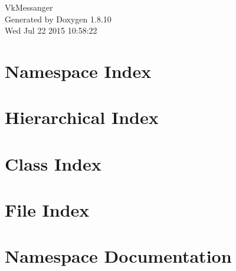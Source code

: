 \documentclass[twoside]{book}
\newcommand{\+}{\discretionary{\mbox{\scriptsize$\hookleftarrow$}}{}{}}
\newcommand{\clearemptydoublepage}{%
  \newpage{\pagestyle{empty}\cleardoublepage}%
}
\begin{document}
\hypersetup{pageanchor=false,
             bookmarks=true,
             bookmarksnumbered=true,
             pdfencoding=unicode
            }
\begin{titlepage}
\vspace*{7cm}
\begin{center}%
{\Large Vk\+Messanger }\\
\vspace*{1cm}
{\large Generated by Doxygen 1.8.10}\\
\vspace*{0.5cm}
{\small Wed Jul 22 2015 10:58:22}\\
\end{center}
\end{titlepage}
\clearemptydoublepage
\tableofcontents
\clearemptydoublepage
{}
\hypersetup{pageanchor=true}

\chapter{Namespace Index}

\chapter{Hierarchical Index}

\chapter{Class Index}

\chapter{File Index}

\chapter{Namespace Documentation}








\end{document}

